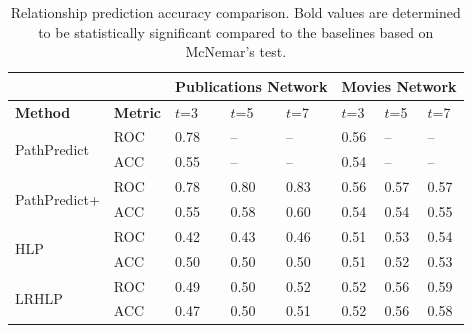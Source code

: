 \begin{table}[t]
\centering
\caption{Relationship prediction accuracy comparison. Bold values are determined to be statistically significant compared to the baselines based on McNemar's test.}
\label{table_publications}\label{tbl:auc}
\begin{tabular}{ll|p{1cm}|p{1cm}|p{1cm}||p{1cm}|p{1cm}|p{1cm}|}
\cline{3-8}
                        &   & \multicolumn{3}{l||}{Publications Network} & \multicolumn{3}{l|}{Movies Network} \\ \hline
\multicolumn{1}{|l|}{\textbf{Method}} & \textbf{Metric} & $t$=3 & $t$=5  & $t$=7  & $t$=3  & $t$=5  & $t$=7     \\ \hline\hline

\multicolumn{1}{|l|}{\multirow{2}{*}{PathPredict}}  & ROC  & 0.78 & -- & -- & 0.56 & -- & -- \\ \cline{2-8}
\multicolumn{1}{|l|}{}  & ACC  & 0.55 & -- & -- & 0.54  & -- & -- \\ \hline\hline

\multicolumn{1}{|l|}{\multirow{2}{*}{PathPredict+}}  & ROC  &  0.78  &   0.80    &     0.83    &   0.56   &    0.57     &    0.57     \\ \cline{2-8}
\multicolumn{1}{|l|}{}  & ACC  & 0.55  & 0.58  &  0.60 & 0.54  &  0.54  & 0.55   \\ \hline\hline

\multicolumn{1}{|l|}{\multirow{2}{*}{HLP}}  & ROC  &   0.42  &   0.43   &   0.46     &     0.51    &    0.53     &    0.54     \\ \cline{2-8}
\multicolumn{1}{|l|}{}  & ACC  & 0.50  &  0.50  &  0.50 &  0.51  &  0.52  &  0.53  \\ \hline\hline

\multicolumn{1}{|l|}{\multirow{2}{*}{LRHLP}}  & ROC  &   0.49   &   0.50   &   0.52    &    0.52     &   0.56   &   0.59      \\ \cline{2-8}
\multicolumn{1}{|l|}{}  & ACC  & 0.47 & 0.50  & 0.51   & 0.52  & 0.56  &  0.58  \\ \hline\hline


\end{tabular}
\end{table}
